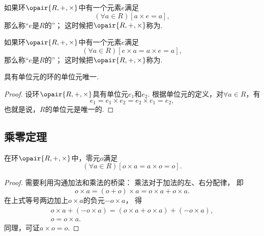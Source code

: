 \begin{definition}
如果环\(\opair{R,+,\times}\)中有一个元素\(e\)满足\begin{equation*}
	(\forall a \in R)[a \times e = a],
\end{equation*}
那么称“\(e\)是\(R\)的”；
这时候把\(\opair{R,+,\times}\)称为.
\end{definition}

\begin{definition}
如果环\(\opair{R,+,\times}\)中有一个元素\(e\)满足\begin{equation*}
	(\forall a \in R)[e \times a = a \times e = a],
\end{equation*}
那么称“\(e\)是\(R\)的”；
这时候把\(\opair{R,+,\times}\)称为.
\end{definition}

\begin{property}
具有单位元的环的单位元唯一.
\begin{proof}
设环\(\opair{R,+,\times}\)具有单位元\(e_1\)和\(e_2\).
根据单位元的定义，对\(\forall a \in R\)，有\begin{equation*}
	e_1 = e_1 \times e_2 = e_2 \times e_1 = e_2,
\end{equation*}
也就是说，\(R\)的单位元是唯一的.
\end{proof}
\end{property}

\subsection{乘零定理}
\begin{theorem}[乘零定理]
在环\(\opair{R,+,\times}\)中，零元\(o\)满足\begin{equation*}
	(\forall a \in R)[o \times a = a \times o = o].
\end{equation*}
\begin{proof}
需要利用沟通加法和乘法的桥梁：
乘法对于加法的左、右分配律，
即\begin{equation*}
	o \times a = (o + o) \times a = o \times a + o \times a.
\end{equation*}
在上式等号两边加上\(o \times a\)的负元\(-o \times a\)，
得\begin{gather*}
	o \times a + (- o \times a) = (o \times a + o \times a) + (- o \times a), \\
	o = o \times a.
\end{gather*}
同理，可证\(a \times o = o\).
\end{proof}
\end{theorem}

